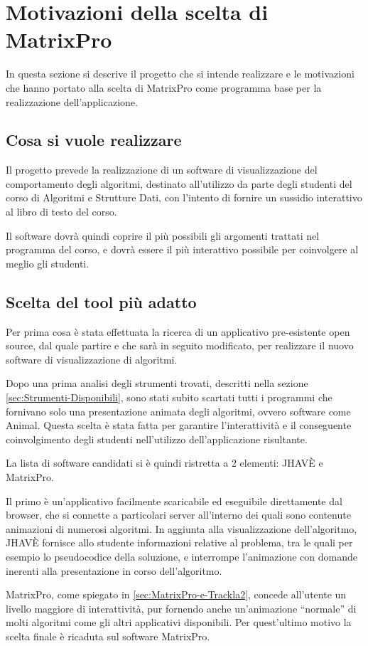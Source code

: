 \section{Motivazioni della scelta di MatrixPro}

In questa sezione si descrive il progetto che si intende realizzare
e le motivazioni che hanno portato alla scelta di MatrixPro come programma
base per la realizzazione dell'applicazione.


\subsection{Cosa si vuole realizzare}

Il progetto prevede la realizzazione di un software di visualizzazione
del comportamento degli algoritmi, destinato all'utilizzo da parte
degli studenti del corso di Algoritmi e Strutture Dati, con l'intento
di fornire un sussidio interattivo al libro di testo del corso.

Il software dovrà quindi coprire il più possibili gli argomenti trattati
nel programma del corso, e dovrà essere il più interattivo possibile
per coinvolgere al meglio gli studenti.


\subsection{Scelta del tool più adatto}

Per prima cosa è stata effettuata la ricerca di un applicativo pre-esistente
open source, dal quale partire e che sarà in seguito modificato, per
realizzare il nuovo software di visualizzazione di algoritmi.

Dopo una prima analisi degli strumenti trovati, descritti nella sezione
\ref{sec:Strumenti-Disponibili}, sono stati subito scartati tutti
i programmi che fornivano solo una presentazione animata degli algoritmi,
ovvero software come Animal. Questa scelta è stata fatta per garantire
l'interattività e il conseguente coinvolgimento degli studenti nell'utilizzo
dell'applicazione risultante.

La lista di software candidati si è quindi ristretta a 2 elementi:
JHAVÈ e MatrixPro.

Il primo è un'applicativo facilmente scaricabile ed eseguibile direttamente
dal browser, che si connette a particolari server all'interno dei
quali sono contenute animazioni di numerosi algoritmi. In aggiunta
alla visualizzazione dell'algoritmo, JHAVÈ fornisce allo studente
informazioni relative al problema, tra le quali per esempio lo pseudocodice
della soluzione, e interrompe l'animazione con domande inerenti alla
presentazione in corso dell'algoritmo.

MatrixPro, come spiegato in \ref{sec:MatrixPro-e-Trackla2}, concede
all'utente un livello maggiore di interattività, pur fornendo anche
un'animazione {}``normale'' di molti algoritmi come gli altri applicativi
disponibili. Per quest'ultimo motivo la scelta finale è ricaduta sul
software MatrixPro.
